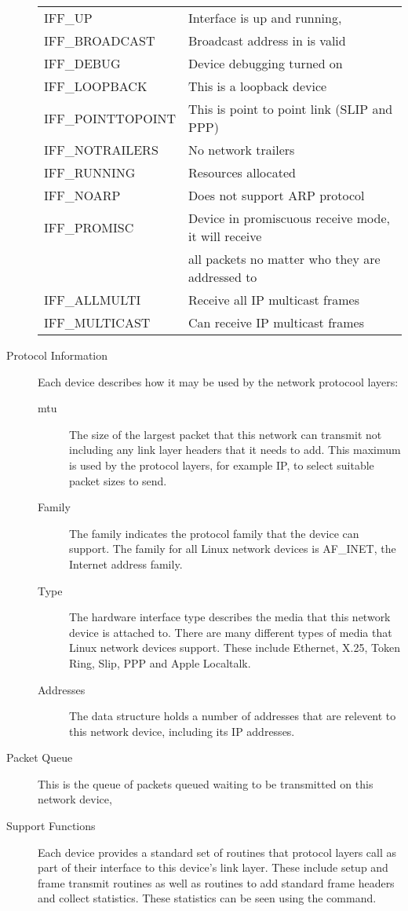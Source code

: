 \begin{description}
		\begin{tabular}{ll}
		IFF\_UP			&	Interface is up and running,				\\
		IFF\_BROADCAST		&	Broadcast address in \ds{device} is valid		\\
		IFF\_DEBUG		&	Device debugging turned on				\\
		IFF\_LOOPBACK		&	This is a loopback device				\\
		IFF\_POINTTOPOINT	&	This is point to point link (SLIP and PPP)		\\
		IFF\_NOTRAILERS		&	No network trailers 					\\
		IFF\_RUNNING		&	Resources allocated					\\
		IFF\_NOARP		& 	Does not support ARP protocol				\\
		IFF\_PROMISC		&	Device in promiscuous receive mode, it will receive 	\\
					&	all packets no matter who they are addressed to		\\
		IFF\_ALLMULTI		&	Receive all IP multicast frames				\\
		IFF\_MULTICAST		&	Can receive IP multicast frames				\\
		\end{tabular}
	\item [Protocol Information] Each device describes how it may be used by the network protocool layers:
		\begin{description}
			\item [mtu] The size of the largest packet that this network can transmit not including any
				link layer headers that it needs to add.   This maximum is used by the protocol layers,
				for example IP, to select suitable packet sizes to send.
			\item [Family] The family indicates the protocol family that the device can support.	The
				family for all Linux network devices is AF\_INET, the Internet address family.
			\item [Type] The hardware interface type describes the media that this network device is
				attached to.  There are many different types of media that Linux network devices
				support.  These include Ethernet, X.25, Token Ring, Slip, PPP and Apple Localtalk.
			\item [Addresses] The  data structure holds a number of addresses that are relevent
				to this network device, including its IP addresses.
		\end{description}
	\item [Packet Queue] This is the queue of  packets queued waiting to be transmitted on
		this network device,
	\item [Support Functions] Each device provides a standard set of routines that protocol layers
		call as part of their interface to this device's link layer.   These include setup and
		frame transmit routines as well as routines to add standard frame headers and collect
		statistics.  These statistics can be seen using the  command.
\end{description}

